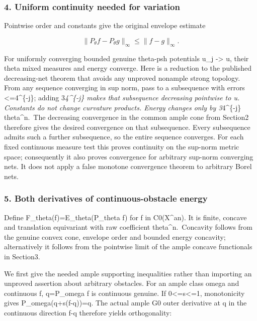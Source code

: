 \documentclass[
]{article}
\begin{document}
\subsubsection{4. Uniform continuity needed for
variation}\label{uniform-continuity-needed-for-variation}

Pointwise order and constants give the original envelope estimate

\[\|P_\theta f-P_\theta g\|_\infty\leq\|f-g\|_\infty.\]

For uniformly converging bounded genuine theta-psh potentials u\_j
-\textgreater{} u, their theta mixed measures and energy converge. Here
is a reduction to the published decreasing-net theorem that avoids any
unproved nonample strong topology. From any sequence converging in sup
norm, pass to a subsequence with errors \textless=4\^{}\{-j\}; adding
3\emph{4\^{}\{-j\} makes that subsequence decreasing pointwise to u.
Constants do not change curvature products. Energy changes only by
3}4\^{}\{-j\} theta\^{}n.~The decreasing convergence in the common ample
cone from Section2 therefore gives the desired convergence on that
subsequence. Every subsequence admits such a further subsequence, so the
entire sequence converges. For each fixed continuous measure test this
proves continuity on the sup-norm metric space; consequently it also
proves convergence for arbitrary sup-norm converging nets. It does not
apply a false monotone convergence theorem to arbitrary Borel nets.

\subsubsection{5. Both derivatives of continuous-obstacle
energy}\label{both-derivatives-of-continuous-obstacle-energy}

Define F\_theta(f)=E\_theta(P\_theta f) for f in C0(X\^{}an). It is
finite, concave and translation equivariant with raw coefficient
theta\^{}n.~Concavity follows from the genuine convex cone, envelope
order and bounded energy concavity; alternatively it follows from the
pointwise limit of the ample concave functionals in Section3.

We first give the needed ample supporting inequalities rather than
importing an unproved assertion about arbitrary obstacles. For an ample
class omega and continuous f, q=P\_omega f is continuous genuine. If
0\textless=s\textless=1, monotonicity gives P\_omega(q+s(f-q))=q. The
actual ample G0 outer derivative at q in the continuous direction f-q
therefore yields orthogonality:
\end{document}
